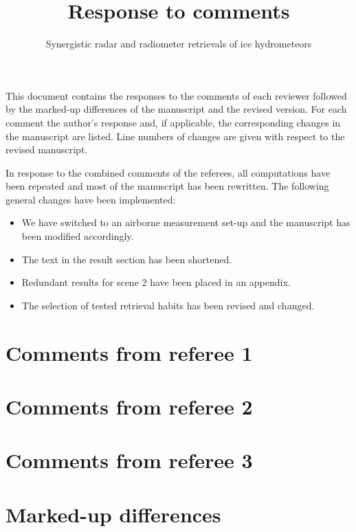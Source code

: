 \documentclass[11pt]{scrreprt}
\title{Response to comments}
\subtitle{Synergistic radar and radiometer retrievals of ice hydrometeors}
\date{}
\begin{document}
\maketitle

\setlength{\parindent}{0cm}

This document contains the responses to the comments of each reviewer followed
by the marked-up differences of the manuscript and the revised version. For each
comment the author's response and, if applicable, the corresponding changes in
the manuscript are listed. Line numbers of changes are given with respect to the
revised manuscript.

In response to the combined comments of the referees, all computations
have been repeated and most of the manuscript has been rewritten. The
following general changes have been implemented:

\begin{itemize}
\item We have switched to an airborne measurement set-up and
   the manuscript has been modified accordingly.
\item The text in the result section has been shortened.
\item Redundant results for scene 2 have been placed in an appendix.
\item The selection of tested retrieval habits has been revised and changed.
\end{itemize}

\chapter{Comments from referee 1}

\chapter{Comments from referee 2}

\chapter{Comments from referee 3}

\chapter{Marked-up differences}





\end{document}
